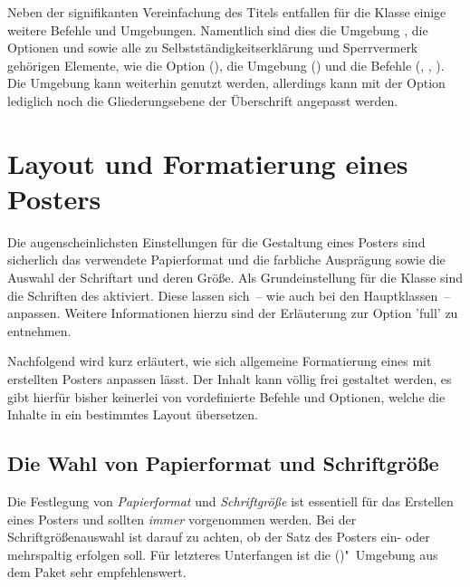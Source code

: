 \begin{Bundle*}[v2.05]{}
Neben der signifikanten Vereinfachung des Titels entfallen für die Klasse 
 einige weitere Befehle und Umgebungen. Namentlich sind 
dies die Umgebung , die Optionen  
und  sowie alle zu Selbstständigkeitserklärung und 
Sperrvermerk gehörigen Elemente, wie die Option (), die 
Umgebung () und die Befehle (, 
, ). Die Umgebung  
kann weiterhin genutzt werden, allerdings kann mit der Option  
lediglich noch die Gliederungsebene der Überschrift angepasst werden.

\section{Layout und Formatierung eines Posters}
%
Die augenscheinlichsten Einstellungen für die Gestaltung eines Posters sind 
sicherlich das verwendete Papierformat und die farbliche Ausprägung sowie die 
Auswahl der Schriftart und deren Größe. Als Grundeinstellung für die Klasse
 sind die Schriften des \TUDCDs aktiviert. Diese lassen 
sich~-- wie auch bei den Hauptklassen~-- anpassen. Weitere Informationen hierzu 
sind der Erläuterung zur Option 'full' zu entnehmen.

Nachfolgend wird kurz erläutert, wie sich allgemeine Formatierung eines mit 
 erstellten Posters anpassen lässt. Der Inhalt kann völlig 
frei gestaltet werden, es gibt hierfür bisher keinerlei von \TUDScript 
vordefinierte Befehle und Optionen, welche die Inhalte in ein bestimmtes Layout 
übersetzen.
 


\subsection{Die Wahl von Papierformat und Schriftgröße}
%
%
%

Die Festlegung von \emph{Papierformat} und \emph{Schriftgröße} ist essentiell 
für das Erstellen eines Posters und sollten \emph{immer} vorgenommen werden. 
Bei der Schriftgrößenauswahl ist darauf zu achten, ob der Satz des Posters 
ein- oder mehrspaltig erfolgen soll. Für letzteres Unterfangen ist die 
()"~Umgebung aus dem Paket 
 sehr empfehlenswert. 


\end{Bundle*}
